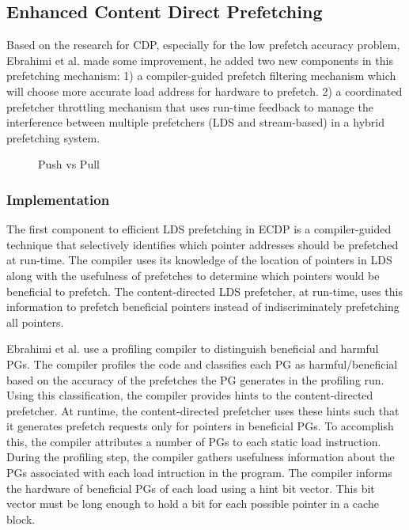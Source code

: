 \documentclass{acm_proc_article-sp}
\begin{document}
\subsection{Enhanced Content Direct Prefetching }
Based on the research for CDP, especially for the low prefetch
accuracy problem, Ebrahimi et al. made some improvement, he added
two new components in this prefetching mechanism: 1) a compiler-guided
prefetch filtering mechanism which will choose more accurate load
address for hardware to prefetch. 2) a coordinated prefetcher
throttling mechanism that uses run-time feedback to manage the
interference between multiple  
prefetchers (LDS and stream-based) in a hybrid prefetching system. 
\cite{4798232}

\begin{figure}
\centering
{}
\caption{Push vs Pull}
\end{figure}

\subsubsection{Implementation}

The first component  to efficient LDS prefetching in ECDP is
a compiler-guided technique that selectively identifies which pointer
addresses should be prefetched at run-time. The compiler uses its
knowledge of the location of pointers in LDS along with  the
usefulness of prefetches to determine which pointers would 
be beneficial to prefetch. The content-directed LDS prefetcher, at
run-time, uses this information to prefetch beneficial pointers instead of
indiscriminately prefetching all pointers.

Ebrahimi et al. use a profiling compiler to distinguish
beneficial and harmful PGs. The compiler profiles the code and
classifies each PG as harmful/beneficial based on the accuracy of the 
prefetches the PG generates in the profiling run. Using this
classification, the compiler provides hints to the content-directed
prefetcher. 
At runtime, the content-directed prefetcher uses these hints such that
it generates prefetch requests only for pointers in beneficial PGs.
To accomplish this, the compiler attributes a number of PGs to each
static load instruction.  During the profiling step, the compiler gathers
usefulness information about the PGs associated with each load
intruction in the program. The compiler informs the hardware of
beneficial PGs of each load using a hint bit vector. This bit vector
must be long enough to hold a bit for each possible pointer in a cache block.
\end{document}
